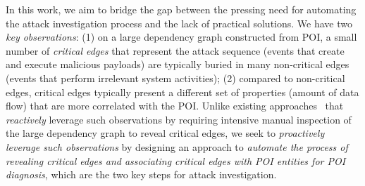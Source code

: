 In this work, we aim to bridge the gap between the pressing need for automating the attack investigation process and the lack of practical solutions.
We have two \emph{key observations}: 
(1) on a large dependency graph constructed from POI,
a small number of \emph{critical edges} that represent the attack sequence (\eg events that create and execute malicious payloads) are typically buried in many non-critical edges (\eg events that perform irrelevant system activities);
(2) compared to non-critical edges, critical edges typically present a different set of properties (\eg amount of data flow) that are more correlated with the POI.
%
Unlike existing 
approaches~\cite{backtracking,backtracking2,taser,intrusionrecovery,liu2018priotracker} that \emph{reactively} leverage such 
observations by requiring intensive manual inspection of the large dependency graph to reveal critical edges,
we seek to \emph{proactively leverage such %
observations} by designing an approach to \emph{automate the process of revealing critical edges and associating critical edges with POI entities for POI diagnosis}, which are the two key steps for attack investigation.



